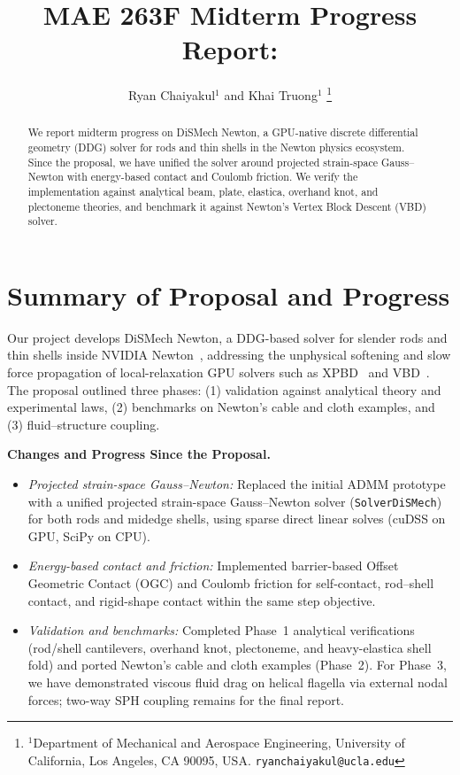\documentclass[letterpaper, 10 pt, conference]{ieeeconf}
\title{\LARGE \bf
MAE 263F Midterm Progress Report: \solver
}
\author{Ryan Chaiyakul$^{1}$ and Khai Truong$^{1}$%
\thanks{$^{1}$Department of Mechanical and Aerospace Engineering,
        University of California, Los Angeles, CA 90095, USA.
        {\tt\small ryanchaiyakul@ucla.edu}}%
}
\newcommand{\solver}{DiSMech Newton}
\begin{document}
\maketitle
\thispagestyle{empty}
\pagestyle{empty}

\begin{abstract}
We report midterm progress on \solver, a GPU-native discrete differential geometry (DDG) solver for rods and thin shells in the Newton physics ecosystem.
Since the proposal, we have unified the solver around projected strain-space Gauss--Newton with energy-based contact and Coulomb friction.
We verify the implementation against analytical beam, plate, elastica, overhand knot, and plectoneme theories, and benchmark it against Newton's Vertex Block Descent (VBD) solver.
\end{abstract}

\section{Summary of Proposal and Progress}

Our project develops \solver, a DDG-based solver for slender rods and thin shells inside NVIDIA Newton~\cite{nvidia2025newton}, addressing the unphysical softening and slow force propagation of local-relaxation GPU solvers such as XPBD~\cite{macklin2016xpbd} and VBD~\cite{chen2024vertex}.
The proposal outlined three phases: (1) validation against analytical theory and experimental laws, (2) benchmarks on Newton's cable and cloth examples, and (3) fluid--structure coupling.

\textbf{Changes and Progress Since the Proposal.}
\begin{itemize}
    \item \emph{Projected strain-space Gauss--Newton:} Replaced the initial ADMM prototype~\cite{daviet2023admm} with a unified projected strain-space Gauss--Newton solver (\texttt{SolverDiSMech}) for both rods and midedge shells, using sparse direct linear solves (cuDSS on GPU, SciPy on CPU).
    \item \emph{Energy-based contact and friction:} Implemented barrier-based Offset Geometric Contact (OGC) and Coulomb friction for self-contact, rod--shell contact, and rigid-shape contact within the same step objective.
    \item \emph{Validation and benchmarks:} Completed Phase~1 analytical verifications (rod/shell cantilevers, overhand knot, plectoneme, and heavy-elastica shell fold) and ported Newton's cable and cloth examples (Phase~2). For Phase~3, we have demonstrated viscous fluid drag on helical flagella via external nodal forces; two-way SPH coupling remains for the final report.
\end{itemize}
\end{document}
